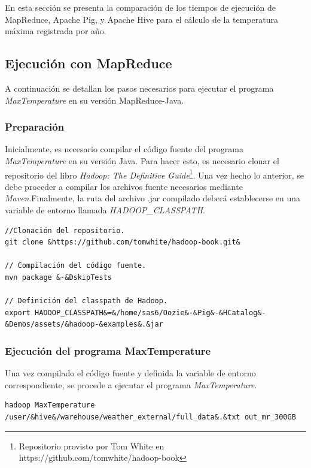 En esta sección se presenta la comparación de los tiempos de ejecución de MapReduce, Apache Pig, y Apache Hive para el cálculo de la temperatura máxima registrada por año. 

\subsection{Ejecución con MapReduce}

A continuación se detallan los pasos necesarios para ejecutar el programa \textit{MaxTemperature} en su versión MapReduce-Java. \\

\subsubsection{Preparación}

Inicialmente, es necesario compilar el código fuente del programa \textit{MaxTemperature} en su versión Java. Para hacer esto, es necesario clonar el repositorio del libro \textit{Hadoop: The Definitive Guide}\footnote{Repositorio provisto por Tom White en https://github.com/tomwhite/hadoop-book}. Una vez hecho lo anterior, se debe proceder a compilar los archivos fuente necesarios mediante \textit{Maven}.Finalmente, la ruta del archivo .jar compilado deberá establecerse en una variable de entorno llamada \textit{HADOOP\_CLASSPATH}. 

\begin{lstlisting}[linewidth=\columnwidth,breaklines=true]
//Clonación del repositorio.
git clone &https://github.com/tomwhite/hadoop-book.git&

// Compilación del código fuente.
mvn package &-&DskipTests

// Definición del classpath de Hadoop.
export HADOOP_CLASSPATH&=&/home/sas6/Oozie&-&Pig&-&HCatalog&-&Demos/assets/&hadoop-&examples&.&jar
\end{lstlisting}


\subsubsection{Ejecución del programa MaxTemperature}

Una vez compilado el código fuente y definida la variable de entorno correspondiente, se procede a ejecutar el programa \textit{MaxTemperature}.

\begin{lstlisting}[linewidth=\columnwidth,breaklines=true]
hadoop MaxTemperature /user/&hive&/warehouse/weather_external/full_data&.&txt out_mr_300GB
\end{lstlisting}


